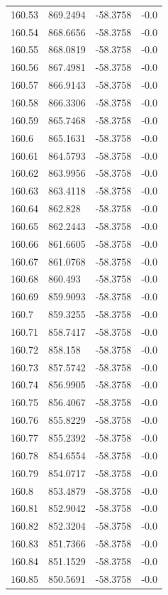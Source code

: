 \begin{table}[H]
\begin{tabular}{llll}
160.53 & 869.2494 & -58.3758 & -0.0 \\
160.54 & 868.6656 & -58.3758 & -0.0 \\
160.55 & 868.0819 & -58.3758 & -0.0 \\
160.56 & 867.4981 & -58.3758 & -0.0 \\
160.57 & 866.9143 & -58.3758 & -0.0 \\
160.58 & 866.3306 & -58.3758 & -0.0 \\
160.59 & 865.7468 & -58.3758 & -0.0 \\
160.6 & 865.1631 & -58.3758 & -0.0 \\
160.61 & 864.5793 & -58.3758 & -0.0 \\
160.62 & 863.9956 & -58.3758 & -0.0 \\
160.63 & 863.4118 & -58.3758 & -0.0 \\
160.64 & 862.828 & -58.3758 & -0.0 \\
160.65 & 862.2443 & -58.3758 & -0.0 \\
160.66 & 861.6605 & -58.3758 & -0.0 \\
160.67 & 861.0768 & -58.3758 & -0.0 \\
160.68 & 860.493 & -58.3758 & -0.0 \\
160.69 & 859.9093 & -58.3758 & -0.0 \\
160.7 & 859.3255 & -58.3758 & -0.0 \\
160.71 & 858.7417 & -58.3758 & -0.0 \\
160.72 & 858.158 & -58.3758 & -0.0 \\
160.73 & 857.5742 & -58.3758 & -0.0 \\
160.74 & 856.9905 & -58.3758 & -0.0 \\
160.75 & 856.4067 & -58.3758 & -0.0 \\
160.76 & 855.8229 & -58.3758 & -0.0 \\
160.77 & 855.2392 & -58.3758 & -0.0 \\
160.78 & 854.6554 & -58.3758 & -0.0 \\
160.79 & 854.0717 & -58.3758 & -0.0 \\
160.8 & 853.4879 & -58.3758 & -0.0 \\
160.81 & 852.9042 & -58.3758 & -0.0 \\
160.82 & 852.3204 & -58.3758 & -0.0 \\
160.83 & 851.7366 & -58.3758 & -0.0 \\
160.84 & 851.1529 & -58.3758 & -0.0 \\
160.85 & 850.5691 & -58.3758 & -0.0 \\

\end{tabular}
\end{table}

